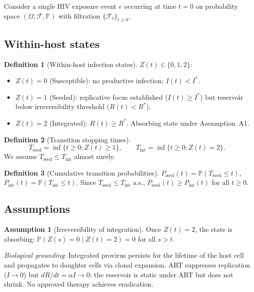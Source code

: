 \documentclass[11pt]{article}
\theoremstyle{definition}
\newtheorem{definition}{Definition}[section]
\newtheorem{assumption}{Assumption}[section]
\theoremstyle{remark}
\newcommand{\Tseed}{T_{\text{seed}}}
\newcommand{\Tint}{T_{\text{int}}}
\newcommand{\Pseed}{P_{\text{seed}}}
\newcommand{\Pint}{P_{\text{int}}}
\begin{document}
Consider a single HIV exposure event $e$ occurring at time $t = 0$ on probability space $(\Omega, \mathcal{F}, \mathbb{P})$ with filtration $\{\mathcal{F}_{t}\}_{t \geq 0}$.

\subsection{Within-host states}

\begin{definition}[Within-host infection states]
$Z(t) \in \{0, 1, 2\}$:
\begin{itemize}[nosep,leftmargin=2em]
    \item $Z(t) = 0$ (Susceptible): no productive infection; $I(t) < I^{*}$.
    \item $Z(t) = 1$ (Seeded): replicative focus established ($I(t) \geq I^{*}$) but reservoir below irreversibility threshold ($R(t) < R^{*}$).
    \item $Z(t) = 2$ (Integrated): $R(t) \geq R^{*}$. Absorbing state under Assumption~A1.
\end{itemize}
\end{definition}

\begin{definition}[Transition stopping times]
\[
\Tseed = \inf\{t \geq 0 : Z(t) \geq 1\}, \qquad
\Tint  = \inf\{t \geq 0 : Z(t) = 2\}.
\]
We assume $\Tseed \leq \Tint$ almost surely.
\end{definition}

\begin{definition}[Cumulative transition probabilities]
$\Pseed(t) = \mathbb{P}(\Tseed \leq t)$, $\Pint(t) = \mathbb{P}(\Tint \leq t)$. Since $\Tseed \leq \Tint$ a.s., $\Pseed(t) \geq \Pint(t)$ for all $t \geq 0$.
\end{definition}

\subsection{Assumptions}

\begin{assumption}[Irreversibility of integration]
Once $Z(t) = 2$, the state is absorbing: $\mathbb{P}(Z(s) = 0 \mid Z(t) = 2) = 0$ for all $s > t$.

\textit{Biological grounding}: Integrated provirus persists for the lifetime of the host cell and propagates to daughter cells via clonal expansion. ART suppresses replication ($I \to 0$) but $dR/dt = \alpha I \to 0$: the reservoir is static under ART but does not shrink. No approved therapy achieves eradication.
\end{assumption}
\end{document}
